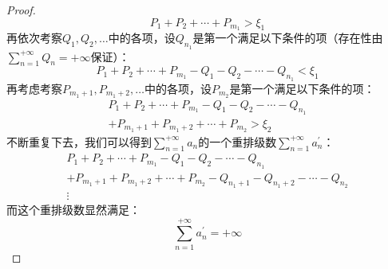 \begin{proof}
\begin{equation*}
		P_1+P_2+\cdots+P_{m_1}>\xi_1
	\end{equation*}
	再依次考察$Q_1,Q_2,\dots$中的各项，设$Q_{n_1}$是第一个满足以下条件的项（存在性由$\sum\limits_{n=1}^{+\infty}Q_n=+\infty$保证）：
	\begin{equation*}
		P_1+P_2+\cdots+P_{m_1}-Q_1-Q_2-\cdots-Q_{n_1}<\xi_1
	\end{equation*}
	再考虑考察$P_{m_1+1},P_{m_1+2},\dots$中的各项，设$P_{m_2}$是第一个满足以下条件的项：
	\begin{gather*}
		P_1+P_2+\cdots+P_{m_1}-Q_1-Q_2-\cdots-Q_{n_1} \\
		+P_{m_1+1}+P_{m_1+2}+\cdots+P_{m_2}>\xi_2
	\end{gather*}
	不断重复下去，我们可以得到$\sum\limits_{n=1}^{+\infty}a_n$的一个重排级数$\sum\limits_{n=1}^{+\infty}a^{'}_n$：
	\begin{gather*}
		P_1+P_2+\cdots+P_{m_1}-Q_1-Q_2-\cdots-Q_{n_1} \\
		+P_{m_1+1}+P_{m_1+2}+\cdots+P_{m_2}-Q_{n_1+1}-Q_{n_1+2}-\cdots-Q_{n_2} \\
		\vdots
	\end{gather*}
	而这个重排级数显然满足：
	\begin{equation*}
		\sum_{n=1}^{+\infty}a^{'}_n=+\infty
	\end{equation*}
\end{proof}













